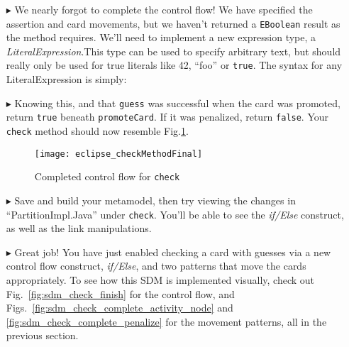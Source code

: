 \begin{itemize}
\item[$\blacktriangleright$] We nearly forgot to complete the control flow! We have specified the assertion and card movements, but we haven't returned a
\texttt{EBoolean} result as the method requires.  We'll need to implement a new expression type, a \emph{LiteralExpression}.This type
can be used to specify arbitrary text, but should really only be used for true literals like 42, ``foo'' or \texttt{true}. The syntax for any LiteralExpression
is simply:

\vspace{0.5cm}

\item[$\blacktriangleright$] Knowing this, and that \texttt{guess} was successful
when the card was promoted, return \texttt{true} beneath \texttt{promoteCard}. If it was penalized, return \texttt{false}. Your \texttt{check} method
should now resemble Fig.\ref{fig:finalMethod}.

\vspace{0.5cm}

\begin{figure}[htbp]
\begin{center}
  \texttt{[image: eclipse\_checkMethodFinal]}
  \caption{Completed control flow for \texttt{check}}
  \label{fig:finalMethod}
\end{center}
\end{figure}

\item[$\blacktriangleright$] Save and build your metamodel, then try viewing the changes in ``PartitionImpl.Java'' under \texttt{check}. You'll be able to
see the \emph{if/Else} construct, as well as the link manipulations. 

\vspace{0.5cm}

\item[$\blacktriangleright$] Great job! You have just enabled checking a card with guesses via a new control flow construct, \emph{if/Else}, and two patterns
that move the cards appropriately. To see how this SDM is implemented visually, check out Fig.~\ref{fig:sdm_check_finish} for the control flow, and
Figs.~\ref{fig:sdm_check_complete_activity_node} and \ref{fig:sdm_check_complete_penalize} for the movement patterns, all in the previous section.

\end{itemize}
 